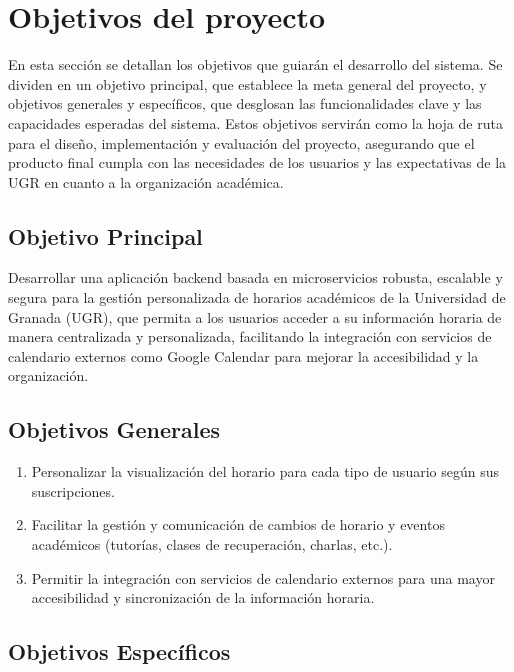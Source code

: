 \section{Objetivos del proyecto}

En esta sección se detallan los objetivos que guiarán el desarrollo del sistema.
Se dividen en un objetivo principal, que establece la meta general del proyecto, y objetivos generales y específicos, que desglosan las funcionalidades clave y las capacidades esperadas del sistema. Estos objetivos servirán como la hoja de ruta para el diseño, implementación y evaluación del proyecto, asegurando que el producto final cumpla con las necesidades de los usuarios y las expectativas de la UGR en cuanto a la organización académica.

\subsection{Objetivo Principal}

Desarrollar una aplicación backend basada en microservicios robusta, escalable y segura para la gestión personalizada de horarios académicos de la Universidad de Granada (UGR), que permita a los usuarios acceder a su información horaria de manera centralizada y personalizada, facilitando la integración con servicios de calendario externos como Google Calendar para mejorar la accesibilidad y la organización.

\subsection{Objetivos Generales}

\begin{enumerate}
    \item Personalizar la visualización del horario para cada tipo de usuario según sus suscripciones.
    \item Facilitar la gestión y comunicación de cambios de horario y eventos académicos (tutorías, clases de recuperación, charlas, etc.).
    \item Permitir la integración con servicios de calendario externos para una mayor accesibilidad y sincronización de la información horaria.
\end{enumerate}

\subsection{Objetivos Específicos}

